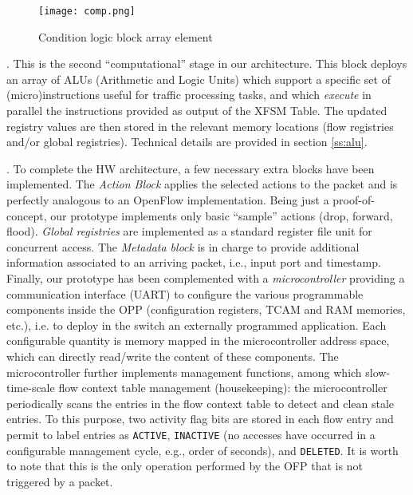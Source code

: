 \documentclass{sig-alternate}
\begin{document}
\begin{figure}[t]
\centering
   \texttt{[image: comp.png]}
      	  \vspace{-2em}
\caption{Condition logic block array element}
   	  \vspace{-1.8em}
\label{F:cond}
\end{figure}

\vspace{3pt} . This is the second ``computational'' stage in our architecture. This block deploys an array of ALUs (Arithmetic and Logic Units) which support a specific set of (micro)instructions useful for traffic processing tasks, and which {\em execute} in parallel the instructions provided as output of the XFSM Table. The updated registry values are then stored in the relevant memory locations (flow registries and/or global registries). Technical details are provided in section \ref{ss:alu}.

\vspace{3pt} . To complete the HW architecture, a few necessary extra blocks have been implemented. The {\em Action Block} applies the selected actions to the packet and is perfectly analogous to an OpenFlow implementation. Being just a proof-of-concept, our prototype implements only basic ``sample'' actions (drop, forward, flood). {\em Global registries} are implemented as a standard register file unit for concurrent access. The {\em Metadata block} is in charge to provide additional information associated to an arriving packet, i.e., input port and timestamp.
Finally, our prototype has been complemented with a {\em microcontroller} providing a communication interface (UART) to configure the various programmable components inside the OPP (configuration registers, TCAM and RAM memories, etc.), i.e. to deploy in the switch an externally programmed application. Each configurable quantity is memory mapped in the microcontroller address space, which can directly read/write the content of these components.  The microcontroller further implements management functions, among which slow-time-scale flow context table management (housekeeping): the microcontroller periodically scans the entries in the flow context table to detect and clean stale entries. To this purpose, two activity flag bits are stored in each flow entry and permit to label entries as \texttt{ACTIVE}, \texttt{INACTIVE} (no accesses have occurred in a configurable management cycle, e.g., order of seconds), and \texttt{DELETED}. It is worth to note that this is the only operation performed by the OFP that is not triggered by a packet.
\end{document}
